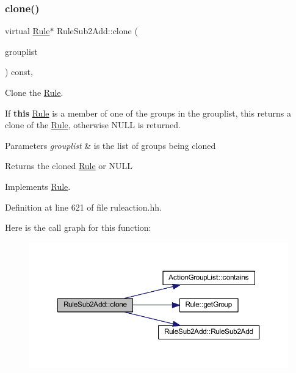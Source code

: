 \subsubsection{\texorpdfstring{clone()}{clone()}}
{\footnotesize\ttfamily virtual \mbox{\hyperlink{class_rule}{Rule}}$\ast$ Rule\+Sub2\+Add\+::clone (\begin{DoxyParamCaption}\item[{const \mbox{\hyperlink{class_action_group_list}{Action\+Group\+List}} \&}]{grouplist }\end{DoxyParamCaption}) const\hspace{0.3cm}{\ttfamily [inline]}, {\ttfamily [virtual]}}



Clone the \mbox{\hyperlink{class_rule}{Rule}}. 

If {\bfseries{this}} \mbox{\hyperlink{class_rule}{Rule}} is a member of one of the groups in the grouplist, this returns a clone of the \mbox{\hyperlink{class_rule}{Rule}}, otherwise N\+U\+LL is returned. 
\begin{DoxyParams}{Parameters}
{\em grouplist} & is the list of groups being cloned \\
\hline
\end{DoxyParams}
\begin{DoxyReturn}{Returns}
the cloned \mbox{\hyperlink{class_rule}{Rule}} or N\+U\+LL 
\end{DoxyReturn}


Implements \mbox{\hyperlink{class_rule_a70de90a76461bfa7ea0b575ce3c11e4d}{Rule}}.



Definition at line 621 of file ruleaction.\+hh.

Here is the call graph for this function\+:
\nopagebreak
\begin{figure}[H]
\begin{center}
\leavevmode
\includegraphics[width=350pt]{class_rule_sub2_add_a2dba60f5a3f711b7320adda2b9f8f92e_cgraph}
\end{center}
\end{figure}
\mbox{\label{class_rule_sub2_add_af7b85d76a9ca080c7236c5842d4b699b}} 
